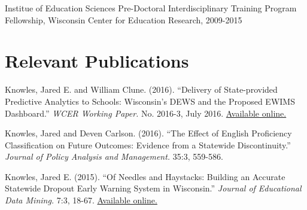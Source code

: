 \documentclass[margin,line]{res}
\begin{document}
\begin{resume}
\vspace*{-2.5mm}

Institue of Education Sciences Pre-Doctoral Interdisciplinary Training Program 
Fellowship, Wisconsin Center for Education Research, 2009-2015


\vspace*{-2.5mm}
\section{\sc Relevant Publications}

Knowles, Jared E. and William Clune. (2016). ``Delivery of State-provided Predictive
Analytics to Schools: Wisconsin’s DEWS and the Proposed EWIMS Dashboard.'' 
\emph{WCER Working Paper.} No. 2016-3, July 2016. \href{http://wcer-web.ad.education.wisc.edu/docs/working-papers/Working_Paper_No_2016_03.pdf}{Available online.}

Knowles, Jared and Deven Carlson. (2016). ``The Effect of English Proficiency Classification on Future Outcomes: 
Evidence from a Statewide Discontinuity.'' \emph{Journal of Policy Analysis and Management.}
35:3, 559-586. 

Knowles, Jared E. (2015). ``Of Needles and Haystacks: Building an Accurate Statewide 
Dropout Early Warning System in Wisconsin.'' \emph{Journal of Educational Data 
Mining.} 7:3, 18-67. 
\href{http://www.educationaldatamining.org/JEDM/index.php/JEDM/article/view/JEDM082}{Available online.}
% 
% 
% 
% 


\end{resume}
\end{document}
